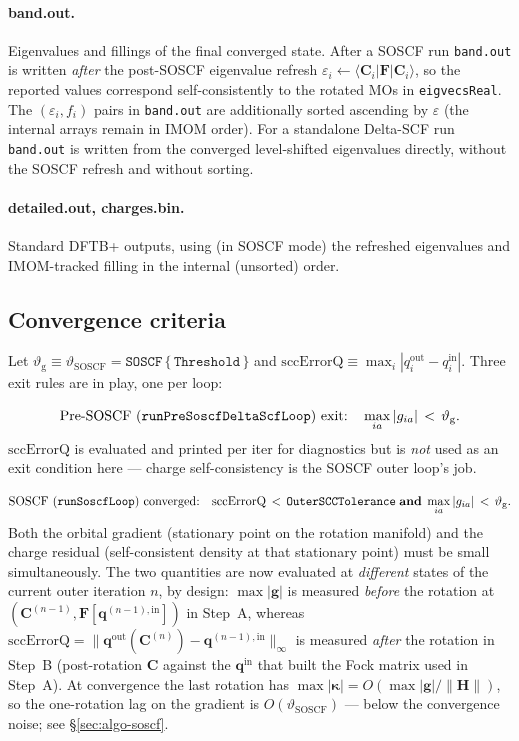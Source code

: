 \documentclass[11pt,a4paper]{article}
\newcommand{\kkappa}{\bm{\kappa}}
\newcommand{\gg}{\mathbf{g}}
\newcommand{\HH}{\mathbf{H}}
\newcommand{\FF}{\mathbf{F}}
\newcommand{\CC}{\mathbf{C}}
\newcommand{\qq}{\mathbf{q}}
\begin{document}
\paragraph{band.out.}
Eigenvalues and fillings of the final converged state. After a SOSCF
run \texttt{band.out} is written \emph{after} the post-SOSCF eigenvalue
refresh $\varepsilon_i \gets \langle\CC_i|\FF|\CC_i\rangle$, so the
reported values correspond self-consistently to the rotated MOs in
\texttt{eigvecsReal}. The $(\varepsilon_i,f_i)$ pairs in
\texttt{band.out} are additionally sorted ascending by $\varepsilon$
(the internal arrays remain in IMOM order). For a standalone
Delta-SCF run \texttt{band.out} is written from the converged
level-shifted eigenvalues directly, without the SOSCF refresh and
without sorting.

\paragraph{detailed.out, charges.bin.}
Standard DFTB+ outputs, using (in SOSCF mode) the refreshed eigenvalues
and IMOM-tracked filling in the internal (unsorted) order.

\subsection{Convergence criteria}

Let $\vartheta_\mathrm{g}\equiv\vartheta_\mathrm{SOSCF}=\mathtt{SOSCF\,\{\,Threshold\,\}}$
and $\mathrm{sccErrorQ}\equiv\max_i|q^\mathrm{out}_i-q^\mathrm{in}_i|$.
Three exit rules are in play, one per loop:

\begin{equation}
\text{Pre-SOSCF (\texttt{runPreSoscfDeltaScfLoop}) exit:}\quad
\max_{ia}|g_{ia}| \,<\, \vartheta_\mathrm{g}.
\label{eq:conv-preSOSCF}
\end{equation}
$\mathrm{sccErrorQ}$ is evaluated and printed per iter for diagnostics
but is \emph{not} used as an exit condition here — charge
self-consistency is the SOSCF outer loop's job.

\begin{equation}
\text{SOSCF (\texttt{runSoscfLoop}) converged:}\quad
\mathrm{sccErrorQ}\,<\,\mathtt{OuterSCCTolerance}
\;\text{\textbf{and}}\;
\max_{ia}|g_{ia}| \,<\, \vartheta_\mathrm{g}.
\label{eq:conv-SOSCF}
\end{equation}
Both the orbital gradient (stationary point on the rotation manifold)
and the charge residual (self-consistent density at that stationary
point) must be small simultaneously. The two quantities are now
evaluated at \emph{different} states of the current outer iteration
$n$, by design: $\max|\gg|$ is measured \emph{before} the rotation at
$(\CC^{(n-1)},\FF[\qq^{(n-1),\mathrm{in}}])$ in Step~A, whereas
$\mathrm{sccErrorQ}=\|\qq^\mathrm{out}(\CC^{(n)})-\qq^{(n-1),\mathrm{in}}\|_\infty$
is measured \emph{after} the rotation in Step~B (post-rotation $\CC$
against the $\qq^\mathrm{in}$ that built the Fock matrix used in
Step~A). At convergence the last rotation has
$\max|\kkappa|=O(\max|\gg|/\|\HH\|)$, so the one-rotation lag on the
gradient is $O(\vartheta_\mathrm{SOSCF})$ --- below the convergence
noise; see \S\ref{sec:algo-soscf}.
\end{document}
